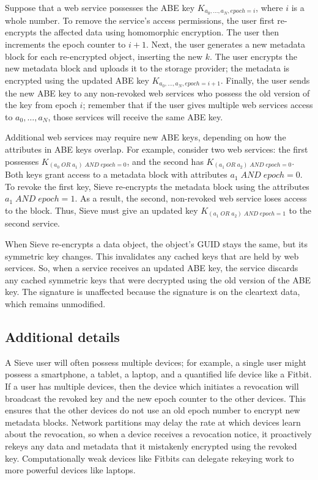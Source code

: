 Suppose that a web service possesses the ABE
key $K_{a_0,\ldots,a_N,epoch=i}$, where $i$ is a
whole number. To remove the service's access
permissions, the user first re-encrypts the
affected data using homomorphic encryption.
The user then increments the epoch counter to
$i+1$. Next, the user generates a new metadata
block for each re-encrypted object, inserting
the new $k$. The user encrypts the new metadata
block and uploads it to the storage provider;
the metadata is encrypted using the updated
ABE key $K_{a_0,\ldots,a_N,epoch=i+1}$. Finally, the
user sends the new ABE key to any non-revoked
web services who possess the old version of
the key from epoch $i$; remember that if the
user gives multiple web services access to
$a_0,\ldots,a_N$, those services will receive
the same ABE key.

Additional web services may require new ABE
keys, depending on how the attributes in ABE
keys overlap. For example, consider two web services:
the first possesses \allowbreak $K_{(a_0\; OR\; a_1)\; AND\; epoch=0}$,
and the second has $K_{(a_1\; OR\; a_2)\; AND\; epoch=0}$.
Both keys grant access to a metadata block
with attributes $a_1\; AND\; epoch=0$. To revoke
the first key, Sieve re-encrypts the metadata
block using the attributes $a_1\; AND\; epoch=1$.
As a result, the second, non-revoked web service
loses access to the block. Thus, Sieve must
give an updated key $K_{(a_1\; OR\; a_2)\; AND\; epoch=1}$
to the second service.

When Sieve re-encrypts a data object, the
object's GUID stays the same, but its symmetric
key changes. This invalidates any cached keys
that are held by web services. So, when a
service receives an updated ABE key, the
service discards any cached symmetric keys
that were decrypted using the old version
of the ABE key. The signature is unaffected
because the signature is on the cleartext data, which
remains unmodified.


\subsection{Additional details} A Sieve user
will often possess multiple devices; for example,
a single user might possess a smartphone, a tablet, a
laptop, and a quantified life device like a
Fitbit. If a user has multiple devices, then
the device which initiates a revocation will
broadcast the revoked key and the new epoch
counter to the other devices. This ensures
that the other devices do not use an old epoch
number to encrypt new metadata blocks. Network
partitions may delay the rate at which devices
learn about the revocation, so when a device
receives a revocation notice, it proactively
rekeys any data and metadata that it mistakenly
encrypted using the revoked key. Computationally
weak devices like Fitbits can delegate rekeying
work to more powerful devices like laptops.

